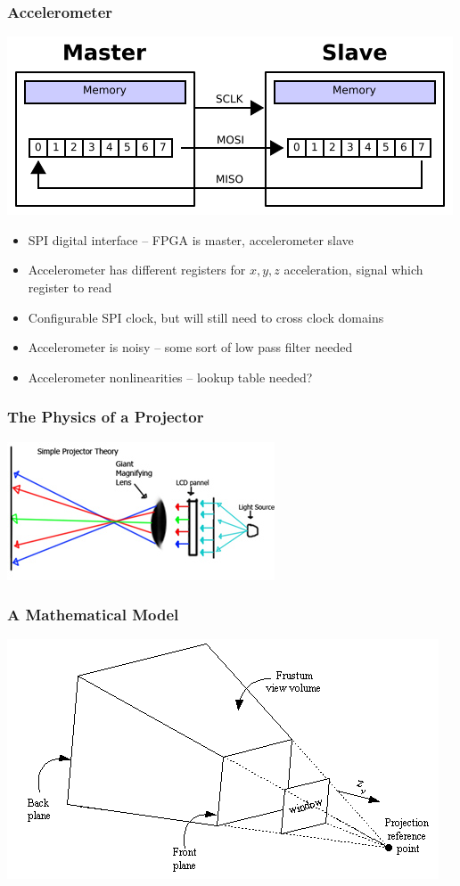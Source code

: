 \documentclass{beamer}
\begin{document}
\begin{frame}
\frametitle{Accelerometer}
\includegraphics[scale=0.4]{img/spi}
\begin{itemize}
\item SPI digital interface -- FPGA is master, accelerometer slave
\item Accelerometer has different registers for $x, y, z$ acceleration, signal which register to read
\item Configurable SPI clock, but will still need to cross clock domains
\pause
\item Accelerometer is noisy -- some sort of low pass filter needed
\item Accelerometer nonlinearities -- lookup table needed?
\end{itemize}
\end{frame}
\begin{frame}
\frametitle{The Physics of a Projector}
\includegraphics[height=0.5\textheight]{./img/projector_physics}
\end{frame}

\begin{frame}
\frametitle{A Mathematical Model}
\includegraphics[height=0.5\textheight]{./img/projective_frustrum}
\end{frame}
\end{document}
